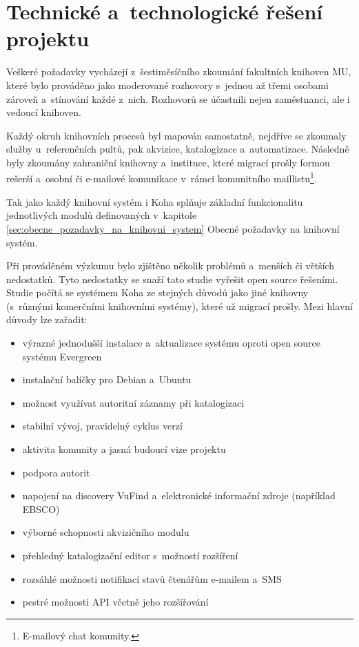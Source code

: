 \documentclass[
	11pt, oneside, printed, final, palatino
	microtype,
	table,   %
	lof,     %
	lot     %
]{fithesis3}
\begin{document}
{\section{Technické a~technologické řešení projektu}

Veškeré požadavky vycházejí z~šestiměsíčního zkoumání fakultních knihoven MU, které bylo prováděno jako moderované rozhovory s~jednou až třemi osobami zároveň a~stínování každé z~nich. Rozhovorů se účastnili nejen zaměstnanci, ale i vedoucí knihoven. 

Každý okruh knihovních procesů byl mapován samostatně, nejdříve se zkoumaly služby u~referenčních pultů, pak akvizice, katalogizace a~automatizace. Následně byly zkoumány zahraniční knihovny a~instituce, které migrací prošly formou rešerší a~osobní či e-mailové komunikace v~rámci komunitního maillistu\footnote{E-mailový chat komunity.}. 

Tak jako každý knihovní systém i Koha splňuje základní funkcionalitu jednotlivých modulů definovaných v~kapitole \ref{sec:obecne_pozadavky_na_knihovni_system} Obecné požadavky na knihovní systém.

Při prováděném výzkumu bylo zjištěno několik problémů a~menších či větších nedostatků. Tyto nedostatky se snaží tato studie vyřešit open source řešeními. Studie počítá se systémem Koha ze stejných důvodů jako jiné knihovny (s~různými komerčními knihovními systémy), které už migrací prošly. Mezi hlavní důvody lze zařadit: 

\begin{itemize}
\item výrazné jednodušší instalace a~aktualizace systému oproti open source systému Evergreen
\item instalační balíčky pro Debian a~Ubuntu
\item možnost využívat autoritní záznamy při katalogizaci
\item stabilní vývoj, pravidelný cyklus verzí
\item aktivita komunity a jasná budoucí vize projektu
\item podpora autorit
\item napojení na discovery VuFind a~elektronické informační zdroje (například EBSCO)
\item výborné schopnosti akvizičního modulu
\item přehledný katalogizační editor s~možností rozšíření
\item rozsáhlé možnosti notifikací stavů čtenářům e-mailem a~SMS
\item pestré možnosti API včetně jeho rozšiřování
\end{itemize}

}
\end{document}

